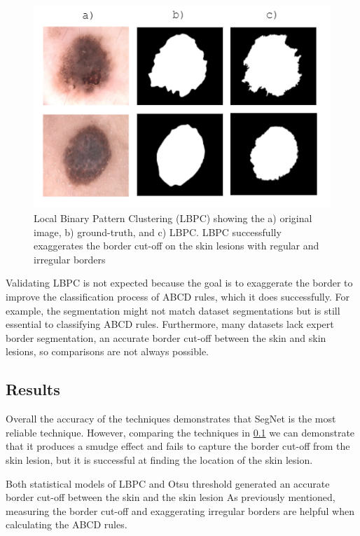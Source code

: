 \begin{figure}
\centering
\includegraphics[scale=1.2]{images/borders.PNG}
\caption{Local Binary Pattern Clustering (LBPC) showing the a) original image, b) ground-truth, and c) LBPC. LBPC successfully exaggerates the border cut-off on the skin lesions with regular and irregular borders} 
\end{figure}\label{fractal1}

Validating LBPC is not expected because the goal is to exaggerate the border to improve the classification process of ABCD rules, which it does successfully\cite{Pereira2020, Kaya2016}. For example, the segmentation might not match dataset segmentations but is still essential to classifying ABCD rules. Furthermore, many datasets lack expert border segmentation, an accurate border cut-off between the skin and skin lesions, so comparisons are not always possible.

\subsection{Results}
Overall the accuracy of the techniques demonstrates that SegNet is the most reliable technique. However, comparing the techniques in \ref{} we can demonstrate that it produces a smudge effect and fails to capture the border cut-off from the skin lesion, but it is successful at finding the location of the skin lesion.

Both statistical models of LBPC and Otsu threshold generated an accurate border cut-off between the skin and the skin lesion As previously mentioned, measuring the border cut-off and exaggerating irregular borders are helpful when calculating the ABCD rules. 


